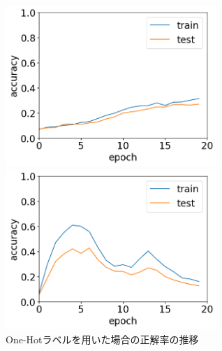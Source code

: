 \documentclass[11pt,a4paper,uplatex]{ujarticle}
\begin{document}
  \begin{figure}[tbp]
    \begin{minipage}[b]{0.495\textwidth}
      \centering
      \includegraphics[keepaspectratio, width=80mm]{Images/python/acc_202402051754.png}
    \end{minipage}
    \begin{minipage}[b]{0.495\textwidth}
      \centering
      \includegraphics[keepaspectratio, width=80mm]{Images/python/acc_202402052233.png}
    \end{minipage}
    \caption{One-Hotラベルを用いた場合の正解率の推移}
    \label{fig:acc_onehot}
  \end{figure}
\end{document}
